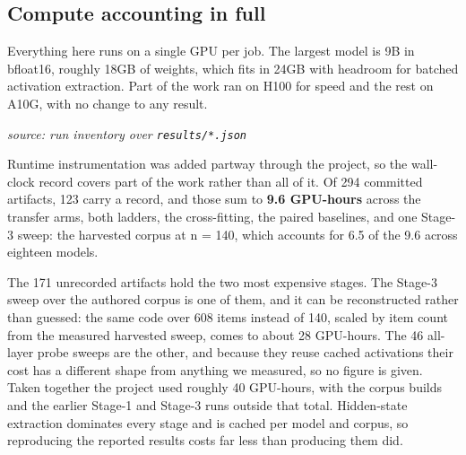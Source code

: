 \documentclass[10pt]{article}
\begin{document}
\subsection{Compute accounting in full}

Everything here runs on a single GPU per job. The largest model is 9B in bfloat16, roughly 18GB of weights, which fits in 24GB with headroom for batched activation extraction. Part of the work ran on H100 for speed and the rest on A10G, with no change to any result.

{\footnotesize\raggedright\sloppy \emph{source: run inventory over \texttt{results/*.json}}\par}

\begin{table}[H]
\centering
\small
{}
\end{table}

Runtime instrumentation was added partway through the project, so the wall-clock record covers part of the work rather than all of it. Of 294 committed artifacts, 123 carry a record, and those sum to \textbf{9.6 GPU-hours} across the transfer arms, both ladders, the cross-fitting, the paired baselines, and one Stage-3 sweep: the harvested corpus at n = 140, which accounts for 6.5 of the 9.6 across eighteen models.

The 171 unrecorded artifacts hold the two most expensive stages. The Stage-3 sweep over the authored corpus is one of them, and it can be reconstructed rather than guessed: the same code over 608 items instead of 140, scaled by item count from the measured harvested sweep, comes to about 28 GPU-hours. The 46 all-layer probe sweeps are the other, and because they reuse cached activations their cost has a different shape from anything we measured, so no figure is given. Taken together the project used roughly 40 GPU-hours, with the corpus builds and the earlier Stage-1 and Stage-3 runs outside that total. Hidden-state extraction dominates every stage and is cached per model and corpus, so reproducing the reported results costs far less than producing them did.
\end{document}
